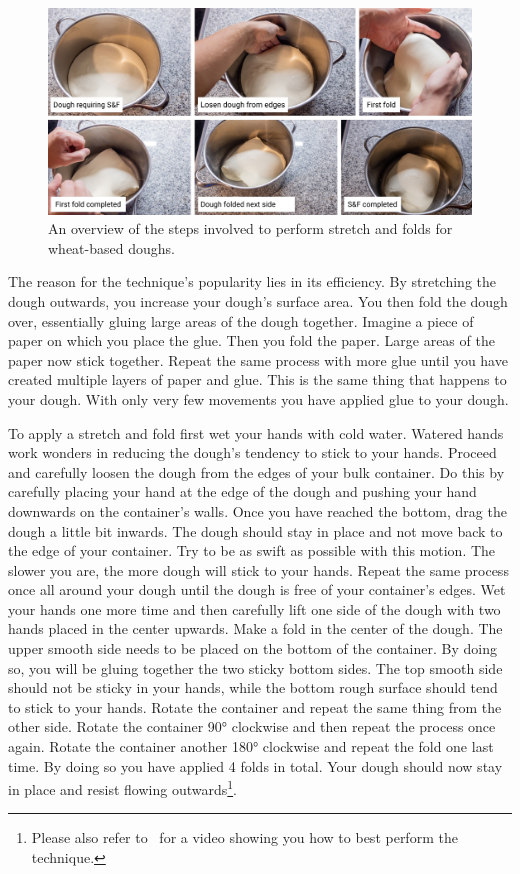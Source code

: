 \begin{figure}[!htb]
  \includegraphics[width=\textwidth]{stretch-and-fold-steps}
  \caption{An overview of the steps involved to perform stretch and folds
  for wheat-based doughs.}%
  \label{figure:stretch-and-fold-steps}
\end{figure}

The reason for the technique's popularity lies in its efficiency. By stretching
the dough outwards, you increase your dough's surface area. You then fold the
dough over, essentially gluing large areas of the dough together. Imagine a
piece of paper on which you place the glue. Then you fold the paper. Large areas
of the paper now stick together. Repeat the same process with more glue until
you have created multiple layers of paper and glue. This is the same thing that
happens to your dough. With only very few movements you have applied glue to your
dough.

To apply a stretch and fold first wet your hands with cold water. Watered hands
work wonders in reducing the dough's tendency to stick to your hands. Proceed and
carefully loosen the dough from the edges of your bulk container. Do this by
carefully placing your hand at the edge of the dough and pushing your hand
downwards on the container's walls. Once you have reached the bottom, drag the dough
a little bit inwards. The dough should stay in place and not move back to the
edge of your container. Try to be as swift as possible with this motion. The
slower you are, the more dough will stick to your hands. Repeat the same process
once all around your dough until the dough is free of your container's edges.
Wet your hands one more time and then carefully lift one side of the dough with
two hands placed in the center upwards. Make a fold in the center of the dough.
The upper smooth side needs to be placed on the bottom of the container. By doing
so, you will be gluing together the two sticky bottom sides. The top smooth side should
not be sticky in your hands, while the bottom rough surface should tend
to stick to your hands. Rotate the container
and repeat the same thing from the other side. Rotate the container 90°
clockwise and then repeat the process once again. Rotate the container another 180° clockwise
and repeat the fold one last time. By doing so you have applied 4 folds in total. Your
dough should now stay in place and resist flowing outwards\footnote{Please
also refer to~\cite{stretch+and+fold+technique} for a video showing you how to
best perform the technique.}.

